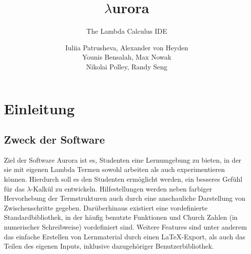 \documentclass[parskip=full,11pt,twoside]{scrbook}
\title{$\lambda$urora}
\subtitle{The Lambda Calculus IDE}
\author{Iuliia Patrusheva, Alexander von Heyden\\
Younis Bensalah, Max Nowak\\
Nikolai Polley, Randy Seng}
\begin{document}
\maketitle
\pagebreak
\setcounter{tocdepth}{4}
\tableofcontents

\newpage
\section{Einleitung}

\subsection{Zweck der Software}
Ziel der Software Aurora ist es, Studenten eine Lernumgebung zu bieten, in der sie mit eigenen Lambda Termen sowohl arbeiten als auch experimentieren können.
Hierdurch soll es den Studenten ermöglicht werden, ein besseres Gefühl für das $\lambda$-Kalkül zu entwickeln.
Hilfestellungen werden neben farbiger Hervorhebung der Termstrukturen auch durch eine anschauliche Darstellung von Zwischenschritte gegeben.
Darüberhinaus existiert eine vordefinierte Standardbibliothek, in der häufig benutzte Funktionen und Church Zahlen (in numerischer Schreibweise) vordefiniert sind.
\newline
Weitere Features sind unter anderem das einfache Erstellen von Lernmaterial durch einen \LaTeX-Export, als auch das Teilen des eigenen Inputs, inklusive dazugehöriger Benutzerbibliothek.
\end{document}
